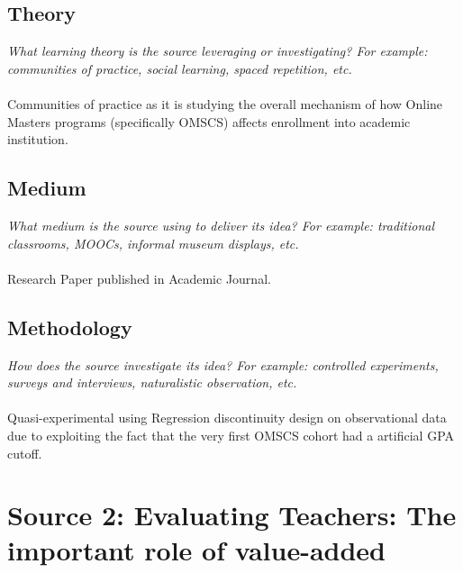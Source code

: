\documentclass[12pt, final]{article}
\begin{document}
\subsection{Theory}
\textit{What learning theory is the source leveraging or investigating? For example: communities of practice, social learning, spaced repetition, etc.}
\\
\\
Communities of practice as it is studying the overall mechanism of how Online Masters programs (specifically OMSCS) affects enrollment into academic institution.

\subsection{Medium}
\textit{What medium is the source using to deliver its idea? For example: traditional classrooms, MOOCs, informal museum displays, etc.}
\\
\\
Research Paper published in Academic Journal.

\subsection{Methodology}
\textit{How does the source investigate its idea? For example: controlled experiments, surveys and interviews, naturalistic observation, etc.}
\\
\\
Quasi-experimental using Regression discontinuity design on observational data due to exploiting the fact that the very first OMSCS cohort had a artificial GPA cutoff.

\section{Source 2: Evaluating Teachers: The important role of value-added} \label{Source 2}
\end{document}
